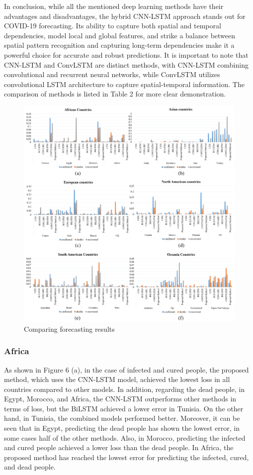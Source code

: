 \documentclass{article}
\begin{document}
In conclusion, while all the mentioned deep learning methods have their advantages and disadvantages, the hybrid CNN-LSTM approach stands out for COVID-19 forecasting. Its ability to capture both spatial and temporal dependencies, model local and global features, and strike a balance between spatial pattern recognition and capturing long-term dependencies make it a powerful choice for accurate and robust predictions. It is important to note that CNN-LSTM and ConvLSTM are distinct methods, with CNN-LSTM combining convolutional and recurrent neural networks, while ConvLSTM utilizes convolutional LSTM architecture to capture spatial-temporal information. The comparison of methods is listed in Table 2 for more clear demonstration.
\begin{figure}
	\centering
	\includegraphics [width=6.2 in] {Res.pdf}
	\caption{Comparing forecasting results}
	\label{figOveall}
\end{figure}
\subsubsection{Africa}
As shown in Figure 6 (a), in the case of infected and cured people, the proposed method, which uses the CNN-LSTM model, achieved the lowest loss in all countries compared to other models. In addition, regarding the dead people, in Egypt, Morocco, and Africa, the CNN-LSTM outperforms other methods in terms of loss, but the BiLSTM achieved a lower error in Tunisia. On the other hand, in Tunisia, the combined models performed better. Moreover, it can be seen that in Egypt, predicting the dead people has shown the lowest error, in some cases half of the other methods. Also, in Morocco, predicting the infected and cured people achieved a lower loss than the dead people. In Africa, the proposed method has reached the lowest error for predicting the infected, cured, and dead people.
\end{document}
